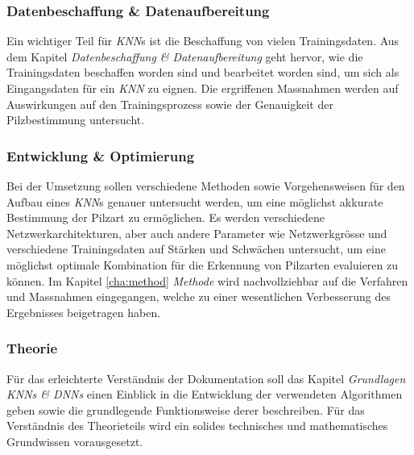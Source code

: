 \subsubsection{Datenbeschaffung \& Datenaufbereitung}
Ein wichtiger Teil für \textit{KNN}s ist die Beschaffung von vielen Trainingsdaten. Aus dem Kapitel \textit{Datenbeschaffung \& Datenaufbereitung} geht hervor, wie die Trainingsdaten beschaffen worden sind und bearbeitet worden sind, um sich als Eingangsdaten für ein \textit{KNN} zu eignen. Die ergriffenen Massnahmen werden auf Auswirkungen auf den Trainingsprozess sowie der Genauigkeit der Pilzbestimmung untersucht.

\subsubsection{Entwicklung \& Optimierung}
Bei der Umsetzung sollen verschiedene Methoden sowie Vorgehensweisen für den Aufbau eines \textit{KNN}s genauer untersucht werden, um eine möglichst akkurate Bestimmung der Pilzart zu ermöglichen. Es werden verschiedene Netzwerkarchitekturen, aber auch andere Parameter wie Netzwerkgrösse und verschiedene Trainingsdaten auf Stärken und Schwächen untersucht, um eine möglichst optimale Kombination für die Erkennung von Pilzarten evaluieren zu können. Im Kapitel \ref{cha:method} \textit{Methode} wird nachvollziehbar auf die Verfahren und Massnahmen eingegangen, welche zu einer wesentlichen Verbesserung des Ergebnisses beigetragen haben.

\subsubsection{Theorie}
Für das erleichterte Verständnis der Dokumentation soll das Kapitel \textit{Grundlagen KNNs \& DNNs} einen Einblick in die Entwicklung der verwendeten Algorithmen geben sowie die grundlegende Funktionsweise derer beschreiben. Für das Verständnis des Theorieteils wird ein solides technisches und mathematisches Grundwissen vorausgesetzt.


